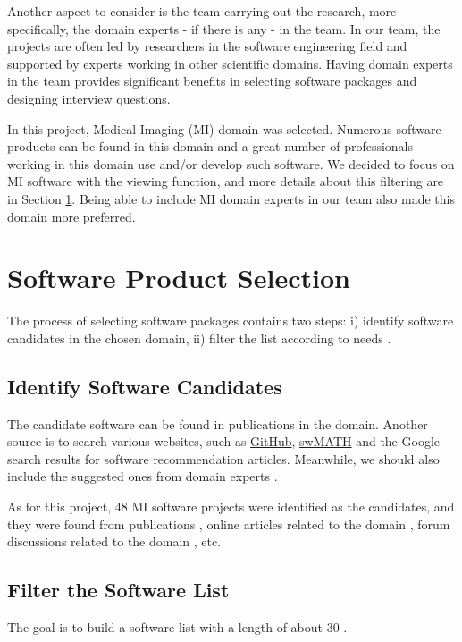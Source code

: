 Another aspect to consider is the team carrying out the research, more specifically, the domain experts - if there is any - in the team. In our team, the projects are often led by researchers in the software engineering field and supported by experts working in other scientific domains. Having domain experts in the team provides significant benefits in selecting software packages and designing interview questions.

In this project, Medical Imaging (MI) domain was selected. Numerous software products can be found in this domain and a great number of professionals working in this domain use and/or develop such software. We decided to focus on MI software with the viewing function, and more details about this filtering are in Section \ref{sec_software_selection}. Being able to include MI domain experts in our team also made this domain more preferred.

\section{Software Product Selection}
\label{sec_software_selection}

The process of selecting software packages contains two steps: i) identify software candidates in the chosen domain, ii) filter the list according to needs \cite{SmithEtAl2021}.

\subsection{Identify Software Candidates}
\label{sec_identify_software_candidates}
The candidate software can be found in publications in the domain. Another source is to search various websites, such as \hyperlink{https://github.com/}{GitHub}, \hyperlink{https://swmath.org/}{swMATH} and the Google search results for software recommendation articles. Meanwhile, we should also include the suggested ones from domain experts \cite{SmithEtAl2021}.

As for this project, 48 MI software projects were identified as the candidates, and they were found from publications \cite{Bjorn2017} \cite{Bruhschwein2019} \cite{Haak2015}, online articles related to the domain \cite{Emms2019} \cite{Hasan2020} \cite{Mu2019}, forum discussions related to the domain \cite{Samala2014}, etc.

\subsection{Filter the Software List}
The goal is to build a software list with a length of about 30 \cite{SmithEtAl2021}.

